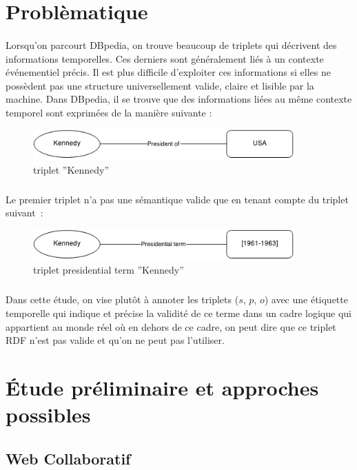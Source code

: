 \documentclass[12pt,a4	]{report}
\begin{document}
\section{Problèmatique}
\paragraph{}
Lorsqu’on parcourt DBpedia, on trouve beaucoup de triplets qui décrivent des informations temporelles. Ces derniers sont généralement liés à un contexte événementiel précis.
Il est plus difficile d’exploiter ces informations si elles ne possèdent pas une structure universellement valide, claire et lisible par la machine. Dans DBpedia, il se trouve que des informations liées au même contexte temporel sont exprimées de la manière suivante : 
\begin{figure}[H]
        \centering
                \centering
                \includegraphics[width=10cm]{ken.png}
               \caption{triplet ''Kennedy''}

\end{figure}
\subparagraph{}
Le premier triplet n'a pas une sémantique valide que en tenant compte du triplet suivant~: 
\begin{figure}[H]
        \centering
                \centering
                \includegraphics[width=10cm]{presidterm.png}
               \caption{triplet presidential term ''Kennedy''}

\end{figure}
\subparagraph{}
Dans cette étude, on vise plutôt à annoter les triplets ($s$, $p$, $o$) avec une étiquette temporelle qui indique et précise la validité de ce terme dans un cadre logique qui appartient au monde réel où en dehors de ce cadre, on peut dire que ce triplet RDF n’est pas valide et qu’on ne peut pas l’utiliser.

\section{Étude préliminaire et approches possibles}
\subsection{Web Collaboratif}
\end{document}
